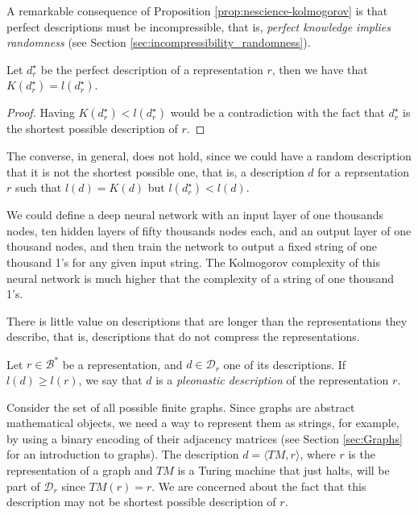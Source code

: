 A remarkable consequence of Proposition \ref{prop:nescience-kolmogorov} is that perfect descriptions must be incompressible, that is, \emph{perfect knowledge implies randomness} (see Section \ref{sec:incompressibility_randomness}).

\begin{corollary}
Let $d_r^{\star}$ be the perfect description of a representation $r$, then we have that $K \left( d_r^{\star} \right) = l \left( d_r^{\star} \right)$.
\end{corollary}
\begin{proof}
Having $K \left( d_r^{\star} \right) < l \left( d_r^{\star} \right)$ would be a contradiction with the fact that $d_r^{\star}$ is the shortest possible description of $r$.
\end{proof}

The converse, in general, does not hold, since we could have a random description that it is not the shortest possible one, that is, a description $d$ for a reprsentation $r$ such that $l(d) = K(d)$ but $l(d_r^{\star}) < l(d)$.

\begin{example}
\label{ex:description_neural}
We could define a deep neural network with an input layer of one thousands nodes, ten hidden layers of fifty thousands nodes each, and an output layer of one thousand nodes, and then train the network to output a fixed string of one thousand 1's for any given input string. The Kolmogorov complexity of this neural network is much higher that the complexity of a string of one thousand 1's.
\end{example}

There is little value on descriptions that are longer than the representations they describe, that is, descriptions that do not compress the representations.

\begin{definition}
\label{def:trivial_model}
Let $r \in \mathcal{B}^\ast$ be a representation, and $d \in \mathcal{D}_r$ one of its descriptions. If $l(d) \geq l(r)$, we say that $d$ is a \emph{pleonastic description} of the representation $r$.
\end{definition}

\begin{example}
\label{ex:topics_models_graph}
Consider the set of all possible finite graphs. Since graphs are abstract mathematical objects, we need a way to represent them as strings, for example, by using a binary encoding of their adjacency matrices (see Section \ref{sec:Graphs} for an introduction to graphs). The description $d = \langle TM, r \rangle$, where $r$ is the representation of a graph and $TM$ is a Turing machine that just halts, will be part of $\mathcal{D}_r$ since $TM(r) = r$. We are concerned about the fact that this description may not be shortest possible description of $r$.
\end{example}

